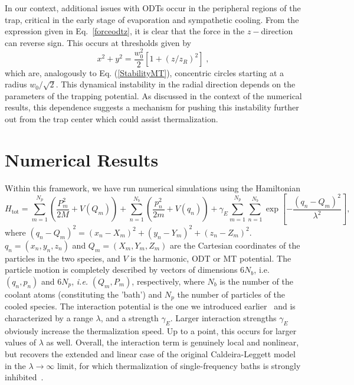 \documentclass[pra,letterpaper,onecolumn,superscriptaddress,floatfix]{revtex4}
\begin{document}
In our context, additional issues with ODTs occur in the peripheral regions of the trap, critical in the early stage
of evaporation and sympathetic cooling. From the expression given in Eq.~\ref{forceodtz}, it is clear that the force
in the $z-$direction can reverse sign. This occurs at thresholds given by 
\begin{equation}
x^2+y^2 = \frac{w_0^2}{2}\left[ 1+(z/z_R)^2\right] \;,
\tag{8}
\label{StabilityODT}
\end{equation}
which are, analogously to Eq. (\ref{StabilityMT}), concentric circles starting at a radius $w_0/\sqrt{2}$. 
This dynamical instability in the radial direction depends on the parameters of the trapping potential.
As discussed in the context of the numerical results, this dependence suggests a mechanism for pushing this
instability further out from the trap center which could assist thermalization.

\section{Numerical Results}

Within this framework, we have run numerical simulations using the Hamiltonian 
\begin{equation}
H_{\mathrm{tot}} =  \sum_{m=1}^{N_p} \left( \frac{P_{m}^2}{2M} +  V(Q_{m}) \right) +
\sum_{n=1}^{N_b} \left(  \frac{p_{n}^2}{2m} + V(q_n) \right) \nonumber  
+ \gamma_E \sum_{m=1}^{N_p} \sum_{n=1}^{N_b} \exp \left[-\frac{(q_n-Q_m)^2}{\lambda^2}\right],
\tag{9}
\label{hamil}
\end{equation}
where $(q_n-Q_m)^2=(x_n-X_m)^2+(y_n-Y_m)^2+(z_n-Z_m)^2$. $q_n=(x_n,y_n,z_n)$ and $Q_m=(X_m,Y_m,Z_m)$ are the
Cartesian coordinates of the particles in the two species, and $V$ is the harmonic, ODT or MT potential.
The particle motion is completely described by vectors of dimensions $6N_b$, i.e. $(q_n,p_n)$ and $6N_p$, {\it i.e.}
$(Q_m,P_m)$, respectively, where $N_b$ is the number of the coolant atoms (constituting the 'bath') and $N_p$ the number of
particles of the cooled species. The interaction potential is the one we introduced earlier~\cite{OnoSun} and is
characterized by a range $\lambda$, and a strength $\gamma_E$. Larger interaction strengths $\gamma_E$ obviously increase the 
thermalization speed. Up to a point, this occurs for larger values of $\lambda$ as well. Overall, the interaction term is 
genuinely local and nonlinear, but recovers the extended and linear case of the original Caldeira-Leggett model in the
$\lambda \rightarrow \infty$ limit, for which thermalization of single-frequency baths is strongly inhibited~\cite{Smith}. 
\end{document}

